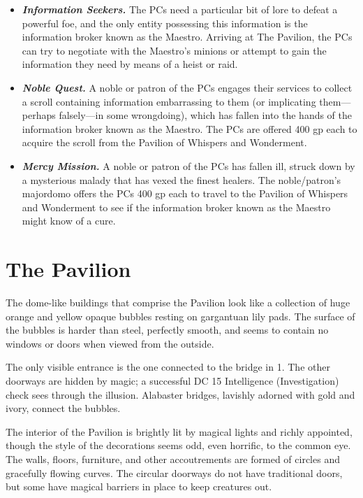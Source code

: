 \documentclass[10pt,a4paper,twoside,bg=print,twocolumn,openany,nodeprecatedcode]{dndbook}
\begin{document}
\begin{itemize}
\item \textbf{\textit{Information Seekers.}} The PCs need a particular bit of lore to defeat a powerful foe, and the only entity possessing this information is the information broker known as the Maestro. Arriving at The Pavilion, the PCs can try to negotiate with the Maestro's minions or attempt to gain the information they need by means of a heist or raid.
\item \textbf{\textit{Noble Quest.}} A noble or patron of the PCs engages their services to collect a scroll containing information embarrassing to them (or implicating them—perhaps falsely—in some wrongdoing), which has fallen into the hands of the information broker known as the Maestro. The PCs are offered 400 gp each to acquire the scroll from the Pavilion of Whispers and Wonderment.
\item \textbf{\textit{Mercy Mission.}} A noble or patron of the PCs has fallen ill, struck down by a mysterious malady that has vexed the finest healers. The noble/patron's majordomo offers the PCs 400 gp each to travel to the Pavilion of Whispers and Wonderment to see if the information broker known as the Maestro might know of a cure.
\end{itemize}

\section{The Pavilion}
The dome-like buildings that comprise the Pavilion look like a collection of huge orange and yellow opaque bubbles resting on gargantuan lily pads. The surface of the bubbles is harder than steel, perfectly smooth, and seems to contain no windows or doors when viewed from the outside.

The only visible entrance is the one connected to the bridge in 1. The other doorways are hidden by magic; a successful DC 15 Intelligence (Investigation) check sees through the illusion. Alabaster bridges, lavishly adorned with gold and ivory, connect the bubbles.

The interior of the Pavilion is brightly lit by magical lights and richly appointed, though the style of the decorations seems odd, even horrific, to the common eye. The walls, floors, furniture, and other accoutrements are formed of circles and gracefully flowing curves. The circular doorways do not have traditional doors, but some have magical barriers in place to keep creatures out.
\end{document}
